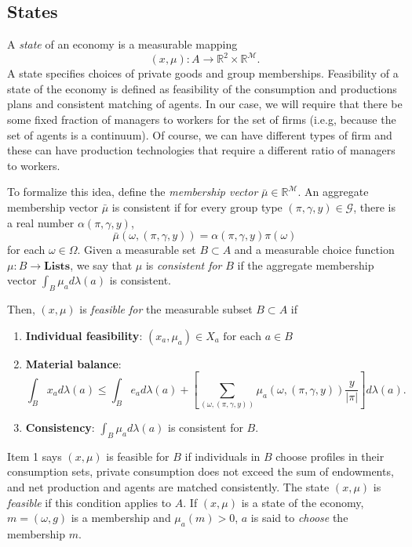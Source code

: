 \documentclass[12pt,letterpaper]{article}
\begin{document}
	 \subsection{States}
	 A \textit{state} of an economy is a measurable mapping
	 \[
	 (x,\mu):A\rightarrow \mathbb{R}^2\times\mathbb{R}^\mathcal{M}.
	 \]
	A state specifies choices of private goods and group memberships.
	Feasibility of a state of the economy is defined as feasibility of the consumption and productions plans and consistent matching of agents.
	In our case, we will require that there be some fixed fraction of managers to workers for the set of firms (i.e.g, because the set of agents is a continuum).
	Of course, we can have different types of firm and these can have production technologies that require a different ratio of managers to workers.
	
	To formalize this idea, define the \textit{membership vector} $\bar{\mu}\in \mathbb{R}^\mathcal{M}$.
	An aggregate membership vector $\bar{\mu}$ is consistent if for every group type $(\pi,\gamma,y)\in\mathcal{G}$, there is a real number $\alpha(\pi,\gamma,y)$,
	\[
	\bar{\mu}(\omega,(\pi,\gamma,y))=\alpha(\pi,\gamma,y)\pi(\omega)
	\]
	for each $\omega\in\Omega$. Given a measurable set $B\subset A$ and a measurable choice function $\mu:B\rightarrow\textbf{Lists}$, we say that $\mu$ is \textit{consistent for} $B$ if the aggregate membership vector $\int_B\mu_ad\lambda(a)$ is consistent.
	
	Then, $(x,\mu)$ is \textit{feasible for} the measurable subset $B\subset A$ if
	\begin{enumerate}
		\item \textbf{Individual feasibility}:  $(x_a,\mu_a)\in X_a\text{ for each } a\in B$
		 \item \textbf{Material balance}: 
		 \[
		 \int_B x_a d\lambda(a)\le \int_B e_a d\lambda(a) + 
		 \left[
		 \sum_{(\omega,(\pi,\gamma,y))} \mu_a(\omega,(\pi,\gamma,y))\frac{y}{|\pi|}
		 \right]d\lambda(a).
		 \]
		 \item \textbf{Consistency}: $\int_B\mu_a d\lambda(a)$ is consistent for $B$.
	\end{enumerate}
	Item 1 says $(x,\mu)$ is feasible for $B$ if individuals in $B$ choose profiles in their consumption sets, private consumption does not exceed the sum of endowments, and net production and agents are matched consistently.
	The state $(x,\mu)$ is \textit{feasible} if this condition applies to $A$.
	If $(x,\mu)$ is  a state of  the economy, $m=(\omega,g)$ is a membership and $\mu_a(m)>0$, $a$ is said to \textit{choose} the membership $m$.
	
\end{document}
